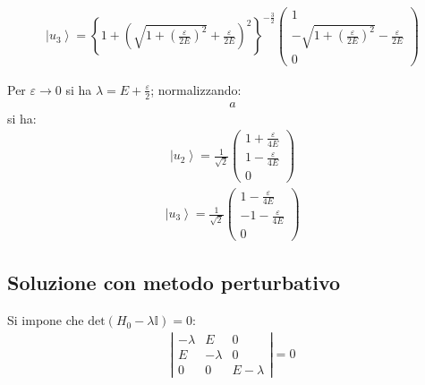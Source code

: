 \begin{equation}\begin{split}
\left |u_3 \right\rangle=\left\{1+\left(\sqrt{1+\left(\frac{\varepsilon}{2E}\right)^2}+\frac{\varepsilon}{2E}\right)^2\right\}^{-\frac{3}{2}}\left(\begin{matrix}1\\-\sqrt{1+\left(\frac{\varepsilon}{2E}\right)^2}-\frac{\varepsilon}{2E}\\0\end{matrix}\right)
\end{split}\end{equation}

Per $\varepsilon \rightarrow 0$ si ha $\lambda=E+\frac{\varepsilon}{2}$; normalizzando:
\begin{equation}\begin{split}
a
\end{split}\end{equation}
si ha:
\begin{equation}\begin{split}
\left |u_2 \right\rangle=\frac{1}{\sqrt{2}}\left(\begin{matrix}1+\frac{\varepsilon}{4E}\\1-\frac{\varepsilon}{4E}\\0\end{matrix}\right)
\end{split}\end{equation}
\begin{equation}\begin{split}
\left |u_3 \right\rangle=\frac{1}{\sqrt{2}}\left(\begin{matrix}1-\frac{\varepsilon}{4E}\\-1-\frac{\varepsilon}{4E}\\0\end{matrix}\right)
\end{split}\end{equation}

\subsection{Soluzione con metodo perturbativo} %
Si impone che $\textrm{det}\left(H_0-\lambda\mathbb{I}\right)=0$:
\begin{equation}\begin{split}
\left|\begin{matrix}-\lambda & E & 0\\E & -\lambda & 0\\0 & 0 & E-\lambda \end{matrix}\right|=0
\end{split}\end{equation}

